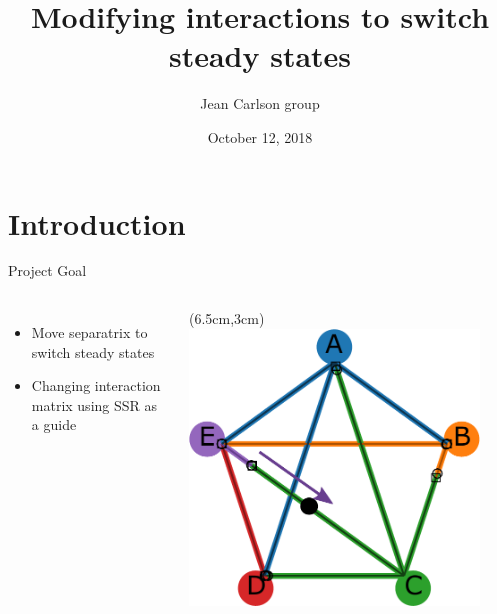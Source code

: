 \documentclass[15pt]{beamer}
\title[Your Short Title]{Modifying interactions to switch steady states}
\author{Jean Carlson group}
\institute{UCSB}
\date{October 12, 2018}
\begin{document}
\begin{frame}
  \titlepage
\end{frame}


\section{Introduction}

\begin{frame}{Project Goal}
\begin{columns}
\begin{itemize}
	\item Move separatrix to switch steady states
	\item Changing interaction matrix using SSR as a guide
\end{itemize}
 
	\begin{textblock*}{6.8cm}(6.5cm,3cm) %
	 \includegraphics[width=0.9\textwidth]{attractor_network_v3_w_arrow}\\[-1ex]
	 {\tiny }
	\end{textblock*}
\end{columns}
\end{frame}
\end{document}
